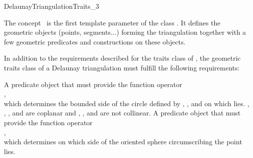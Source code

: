 

\begin{ccRefConcept}{DelaunayTriangulationTraits_3}

\ccDefinition
The concept \ccRefName\ is the first template parameter of the class
. It defines the geometric objects (points,
segments...) forming the triangulation together with a few geometric
predicates and constructions on these objects.

\ccRefines {}

In addition to the requirements described for the traits class of
, the geometric traits class of a
Delaunay triangulation must fulfill the following requirements:

\ccTypes
{}

\ccGlue
{}
\ccGlue
{}
\ccGlue
{}


{A predicate object that must provide the function operator\\
,\\
which determines the bounded side of the circle defined
by , , and  on which  lies.
\ccPrecond {}, , , and  are coplanar and
, , and  are not collinear.}
\ccGlue
{}
{A predicate object that must provide the function operator\\
,\\
which determines on which side of the oriented sphere circumscribing 
 the point  lies.}


\end{ccRefConcept}

